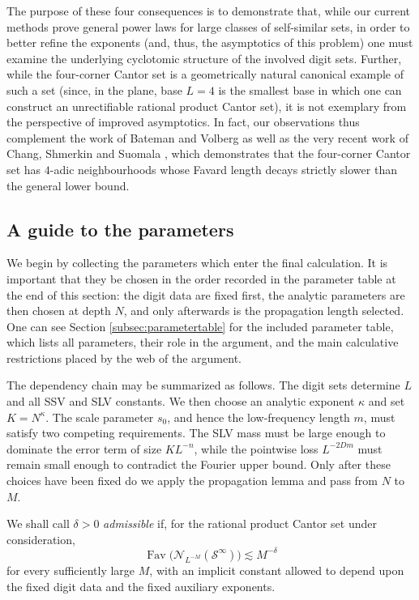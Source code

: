 \documentclass[12pt]{amsart}
\numberwithin{equation}{section}
\DeclareMathOperator{\Fav}{Fav}
\begin{document}
The purpose of these four consequences is to demonstrate that, while our current methods prove general power laws for large classes of self-similar sets, in order to better refine the exponents (and, thus, the asymptotics of this problem) one must examine the underlying cyclotomic structure of the involved digit sets. Further, while the four-corner Cantor set is a geometrically natural canonical example of such a set (since, in the plane, base $L = 4$ is the smallest base in which one can construct an unrectifiable rational product Cantor set), it is not exemplary from the perspective of improved asymptotics. In fact, our observations thus complement the work of Bateman and Volberg \cite{BV} as well as the very recent work of Chang, Shmerkin and Suomala \cite{CSS}, which demonstrates that the four-corner Cantor set has $4$-adic neighbourhoods whose Favard length decays strictly slower than the general lower bound.

\subsection{A guide to the parameters}

We begin by collecting the parameters which enter the final calculation.  It
is important that they be chosen in the order recorded in the parameter table at the end of this section: the digit data are fixed first, the analytic
parameters are then chosen at depth $N$, and only afterwards is the
propagation length selected. One can see Section \ref{subsec:parametertable} for the included parameter table, which lists all parameters, their role in the argument, and the main calculative restrictions placed by the web of the argument.

The dependency chain may be summarized as follows.  The digit sets determine
$L$ and all SSV and SLV constants.  We then choose an analytic exponent
$\kappa$ and set $K=N^\kappa$.  The scale parameter $s_0$, and hence the
low-frequency length $m$, must satisfy two competing requirements.  The SLV
mass must be large enough to dominate the error term of size $KL^{-n}$, while
the pointwise loss $L^{-2Dm}$ must remain small enough to contradict the
Fourier upper bound.  Only after these choices have been fixed do we apply the
propagation lemma and pass from $N$ to $M$.

We shall call $\delta>0$ \emph{admissible} if, for the rational product Cantor
set under consideration,
\[
 \Fav\bigl(\mathcal N_{L^{-M}}(\mathcal S^\infty)\bigr)
 \lesssim M^{-\delta}
\]
for every sufficiently large $M$, with an implicit constant allowed to depend
upon the fixed digit data and the fixed auxiliary exponents.
\end{document}
